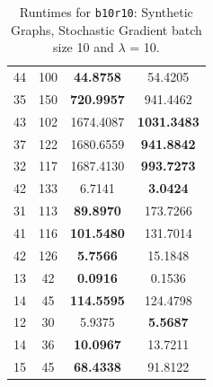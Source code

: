 \documentclass{article}
\begin{document}
\begin{table}[h]
\begin{tabular}{lccc}
44 & 100 & \textbf{44.8758} & 54.4205 \\
35 & 150 & \textbf{720.9957} & 941.4462 \\
43 & 102 & 1674.4087 & \textbf{1031.3483} \\
37 & 122 & 1680.6559 & \textbf{941.8842} \\
32 & 117 & 1687.4130 & \textbf{993.7273} \\
42 & 133 & 6.7141 & \textbf{3.0424} \\
31 & 113 & \textbf{89.8970} & 173.7266 \\
41 & 116 & \textbf{101.5480} & 131.7014 \\
42 & 126 & \textbf{5.7566} & 15.1848 \\
13 & 42 & \textbf{0.0916} & 0.1536 \\
14 & 45 & \textbf{114.5595} & 124.4798 \\
12 & 30 & 5.9375 & \textbf{5.5687} \\
14 & 36 & \textbf{10.0967} & 13.7211 \\
15 & 45 & \textbf{68.4338} & 91.8122 \\
\bottomrule
\end{tabular}
\caption{Runtimes for \texttt{b10r10}: Synthetic Graphs, Stochastic Gradient batch size 10 and $\lambda$ = 10.}
\end{table}
\end{document}
